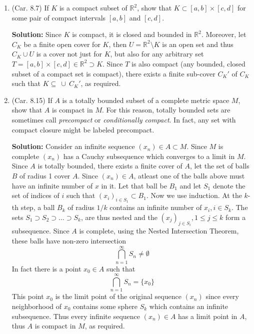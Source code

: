 \documentclass{article}
\def\le{\leqslant}
\def\RR{\mathbb R}
\begin{document}
\begin{enumerate}

\item (Car. 8.7) If $K$ is a compact subset of $\RR^2$, show that $K \subset [a,b] \times [c,d]$ for some pair of compact intervals $[a,b]$ and $[c,d]$.

\textbf{Solution:} Since $K$ is compact, it is closed and bounded in $\RR^2$.
Moreover, let $C_K$ be a finite open cover for $K$, then $U=\RR^2\setminus K$ is an
open set and thus $C_K\cup U$ is a cover not just for $K$, but also for
any arbitrary set $T=[a,b]\times[c,d] \in \RR^2 \supset K$.
Since $T$ is also compact (any bounded, closed subset of a compact set
is compact), there exists a finite sub-cover $C_K'$ of $C_K$ such that
$ K \subseteq\  \cup\  C_K'$,
as required.


\item (Car. 8.15) If $A$ is a totally bounded subset of a complete metric space $M$, show that $A$ is compact in $M$. For this reason, totally bounded sets are sometimes call \textit{precompact} or \textit{conditionally compact}. In fact, any set with compact closure might be labeled precompact.

\textbf{Solution:} Consider an infinite sequence $(x_n)\in A \subset M$. 
Since $M$
is complete $(x_n)$ has a Cauchy subsequence which converges to a limit in $M$.
Since $A$ is totally bounded, there exists a finite
cover of $A$, let the set of balls $B$ of radius 1 cover $A$.
Since $(x_n)\in A$, atleast one of the balls above must have an
infinite number of $x$ in it. Let that ball be $B_1$ and let 
$S_1$ denote the set of indices of $i$ such 
that $(x_i)_{i \in S_1} \subset B_1$.
Now we use induction. At the $k$-th step, a ball $B_k$ of radius $1/k$
contains an infinite number of $x_i, i\in S_k$. The sets 
$S_1 \supset S_2 \supset \ldots \supset S_k$, are thus 
nested and the $(x_j)_{j\in S_i}, 1\le j\le k$ form a subsequence. Since $A$
is complete, using the
Nested Intersection Theorem, these balls have non-zero intersection
\[
\bigcap_{n=1}^\infty S_n \ne \emptyset
\]
In fact there is a point $x_0 \in A$ such that
\[
\bigcap_{n=1}^\infty S_n = \{x_0\}
\]
This point $x_0$ is the limit point of the original sequence $(x_n)$
since every neighborhood of $x_0$ contains some sphere $S_k$ which
contains an infinite subsequence.
Thus every infinite sequence $(x_n)\in A$ has a limit point in $A$, thus
$A$ is compact in $M$, as required.
 

\end{enumerate}
\end{document}
